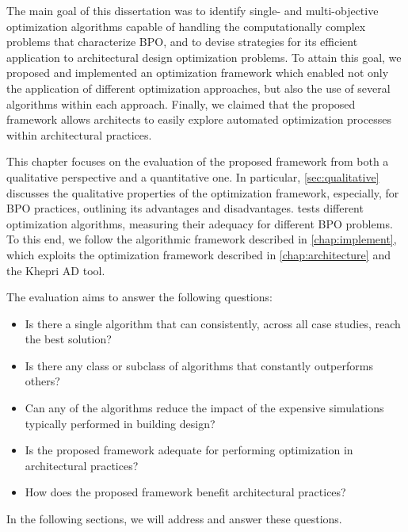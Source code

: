 \label{chap:evaluation}

The main goal of this dissertation was to identify single- and multi-objective optimization algorithms capable of handling the computationally complex problems that characterize \ac{BPO}, and to devise strategies for its efficient application to architectural design optimization problems. To attain this goal, we proposed and implemented an optimization framework which enabled not only the application of different optimization approaches, but also the use of several algorithms within each approach. Finally, we claimed that the proposed framework allows architects to easily explore automated optimization processes within architectural practices. 

This chapter focuses on the evaluation of the proposed framework from both a qualitative perspective and a quantitative one. In particular, \cref{sec:qualitative} discusses the qualitative properties of the optimization framework, especially, for \ac{BPO} practices, outlining its advantages and disadvantages.  tests different optimization algorithms, measuring their adequacy for different \ac{BPO} problems. To this end, we follow the algorithmic framework described in \cref{chap:implement}, which exploits the optimization framework described in \cref{chap:architecture} and the Khepri \ac{AD} tool. 

The evaluation aims to answer the following questions: 
\begin{itemize}
	\item Is there a single algorithm that can consistently, across all case studies, reach the best solution?
	\item Is there any class or subclass of algorithms that constantly outperforms others?
	\item Can any of the algorithms reduce the impact of the expensive simulations typically performed in building design? 
	\item Is the proposed framework adequate for performing optimization in architectural practices? 
	\item How does the proposed framework benefit architectural practices?
\end{itemize}
In the following sections, we will address and answer these questions.

